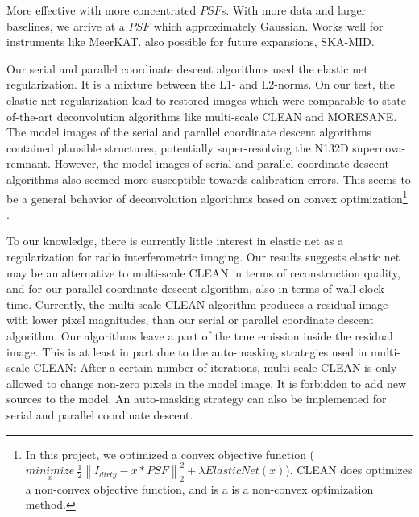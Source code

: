 More effective with more concentrated $PSF$s.
With more data and larger baselines, we arrive at a $PSF$ which approximately Gaussian.
Works well for instruments like MeerKAT. also possible for future expansions, SKA-MID. 




Our serial and parallel coordinate descent algorithms used the elastic net regularization. It is a mixture between the L1- and L2-norms. On our test, the elastic net regularization lead to restored images which were comparable to state-of-the-art deconvolution algorithms like multi-scale CLEAN and MORESANE. The model images of the serial and parallel coordinate descent algorithms contained plausible structures, potentially super-resolving the N132D supernova-remnant. However, the model images of serial and parallel coordinate descent algorithms also seemed more susceptible towards calibration errors. This seems to be a general behavior of deconvolution algorithms based on convex optimization\footnote{In this project, we optimized a convex objective function ($\underset{x}{minimize} \: \frac{1}{2} \left \| I_{dirty} - x * PSF \right \|_2^2 + \lambda ElasticNet(x)$). CLEAN does optimizes a non-convex objective function, and is a is a non-convex optimization method.} \cite{offringa2017optimized}.

To our knowledge, there is currently little interest in elastic net as a regularization for radio interferometric imaging. Our results suggests elastic net may be an alternative to multi-scale CLEAN in terms of reconstruction quality, and for our parallel coordinate descent algorithm, also in terms of wall-clock time. Currently, the multi-scale CLEAN algorithm produces a residual image with lower pixel magnitudes, than our serial or parallel coordinate descent algorithm. Our algorithms leave a part of the true emission inside the residual image. This is at least in part due to the auto-masking strategies used in multi-scale CLEAN: After a certain number of iterations, multi-scale CLEAN is only allowed to change non-zero pixels in the model image. It is forbidden to add new sources to the model. An auto-masking strategy can also be implemented for serial and parallel coordinate descent.

